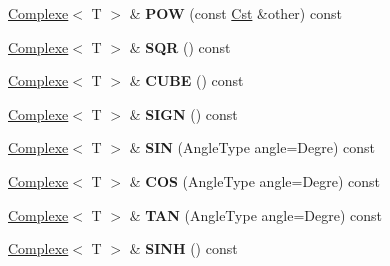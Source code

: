 \begin{DoxyCompactItemize}
\item 
\hypertarget{classcalcul_1_1_complexe_ad44ec7c707a729cad112a10a89bf7116}{\hyperlink{classcalcul_1_1_complexe}{Complexe}$<$ T $>$ \& {\bfseries P\-O\-W} (const \hyperlink{classcalcul_1_1_cst}{Cst} \&other) const }\label{classcalcul_1_1_complexe_ad44ec7c707a729cad112a10a89bf7116}

\item 
\hypertarget{classcalcul_1_1_complexe_aec629e64332eecd04f4c276b349d686a}{\hyperlink{classcalcul_1_1_complexe}{Complexe}$<$ T $>$ \& {\bfseries S\-Q\-R} () const }\label{classcalcul_1_1_complexe_aec629e64332eecd04f4c276b349d686a}

\item 
\hypertarget{classcalcul_1_1_complexe_ab121065d27b0b1001183cda196a0b300}{\hyperlink{classcalcul_1_1_complexe}{Complexe}$<$ T $>$ \& {\bfseries C\-U\-B\-E} () const }\label{classcalcul_1_1_complexe_ab121065d27b0b1001183cda196a0b300}

\item 
\hypertarget{classcalcul_1_1_complexe_ac662ebd095aaff0758fd9206986530c5}{\hyperlink{classcalcul_1_1_complexe}{Complexe}$<$ T $>$ \& {\bfseries S\-I\-G\-N} () const }\label{classcalcul_1_1_complexe_ac662ebd095aaff0758fd9206986530c5}

\item 
\hypertarget{classcalcul_1_1_complexe_a8cb370c02a514564de84e9e693ae4ac7}{\hyperlink{classcalcul_1_1_complexe}{Complexe}$<$ T $>$ \& {\bfseries S\-I\-N} (Angle\-Type angle=Degre) const }\label{classcalcul_1_1_complexe_a8cb370c02a514564de84e9e693ae4ac7}

\item 
\hypertarget{classcalcul_1_1_complexe_ad0e4743116f56f985a84e3cd51f6efe1}{\hyperlink{classcalcul_1_1_complexe}{Complexe}$<$ T $>$ \& {\bfseries C\-O\-S} (Angle\-Type angle=Degre) const }\label{classcalcul_1_1_complexe_ad0e4743116f56f985a84e3cd51f6efe1}

\item 
\hypertarget{classcalcul_1_1_complexe_aa828d019770a344aca27d95aa1d22ca9}{\hyperlink{classcalcul_1_1_complexe}{Complexe}$<$ T $>$ \& {\bfseries T\-A\-N} (Angle\-Type angle=Degre) const }\label{classcalcul_1_1_complexe_aa828d019770a344aca27d95aa1d22ca9}

\item 
\hypertarget{classcalcul_1_1_complexe_a09c8357113fc2ccee4892b282fc4ffc7}{\hyperlink{classcalcul_1_1_complexe}{Complexe}$<$ T $>$ \& {\bfseries S\-I\-N\-H} () const }\label{classcalcul_1_1_complexe_a09c8357113fc2ccee4892b282fc4ffc7}


\end{DoxyCompactItemize}
